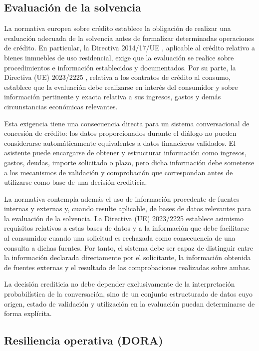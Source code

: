 \documentclass[12pt,a4paper]{report}
\begin{document}
\subsection{Evaluación de la solvencia}

La normativa europea sobre crédito establece la obligación de realizar una evaluación adecuada de la solvencia antes de formalizar determinadas operaciones de crédito. En particular, la Directiva 2014/17/UE \cite{directive2014_17}, aplicable al crédito relativo a bienes inmuebles de uso residencial, exige que la evaluación se realice sobre procedimientos e información establecidos y documentados. Por su parte, la Directiva (UE) 2023/2225 \cite{directive2023_2225}, relativa a los contratos de crédito al consumo, establece que la evaluación debe realizarse en interés del consumidor y sobre información pertinente y exacta relativa a sus ingresos, gastos y demás circunstancias económicas relevantes.

Esta exigencia tiene una consecuencia directa para un sistema conversacional de concesión de crédito: los datos proporcionados durante el diálogo no pueden considerarse automáticamente equivalentes a datos financieros validados. El asistente puede encargarse de obtener y estructurar información como ingresos, gastos, deudas, importe solicitado o plazo, pero dicha información debe someterse a los mecanismos de validación y comprobación que correspondan antes de utilizarse como base de una decisión crediticia.

La normativa contempla además el uso de información procedente de fuentes internas y externas y, cuando resulte aplicable, de bases de datos relevantes para la evaluación de la solvencia. La Directiva (UE) 2023/2225 establece asimismo requisitos relativos a estas bases de datos y a la información que debe facilitarse al consumidor cuando una solicitud es rechazada como consecuencia de una consulta a dichas fuentes. Por tanto, el sistema debe ser capaz de distinguir entre la información declarada directamente por el solicitante, la información obtenida de fuentes externas y el resultado de las comprobaciones realizadas sobre ambas.

La decisión crediticia no debe depender exclusivamente de la interpretación probabilística de la conversación, sino de un conjunto estructurado de datos cuyo origen, estado de validación y utilización en la evaluación puedan determinarse de forma explícita.

\subsection{Resiliencia operativa (DORA)}
\end{document}
